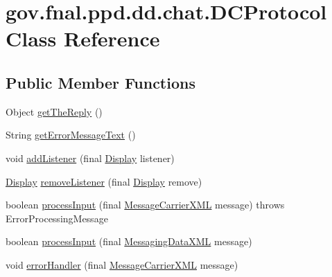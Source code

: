 \hypertarget{classgov_1_1fnal_1_1ppd_1_1dd_1_1chat_1_1DCProtocol}{\section{gov.\-fnal.\-ppd.\-dd.\-chat.\-D\-C\-Protocol Class Reference}
\label{classgov_1_1fnal_1_1ppd_1_1dd_1_1chat_1_1DCProtocol}
}
\subsection*{Public Member Functions}
\begin{DoxyCompactItemize}
\item 
Object \hyperlink{classgov_1_1fnal_1_1ppd_1_1dd_1_1chat_1_1DCProtocol_a17f34e0e46490a5296f36c383e057183}{get\-The\-Reply} ()
\item 
String \hyperlink{classgov_1_1fnal_1_1ppd_1_1dd_1_1chat_1_1DCProtocol_ac722cf203ee54e89313dba3fb6fb5a0d}{get\-Error\-Message\-Text} ()
\item 
void \hyperlink{classgov_1_1fnal_1_1ppd_1_1dd_1_1chat_1_1DCProtocol_a2557f193a252b6bd8c88216df32a0c1d}{add\-Listener} (final \hyperlink{interfacegov_1_1fnal_1_1ppd_1_1dd_1_1signage_1_1Display}{Display} listener)
\item 
\hyperlink{interfacegov_1_1fnal_1_1ppd_1_1dd_1_1signage_1_1Display}{Display} \hyperlink{classgov_1_1fnal_1_1ppd_1_1dd_1_1chat_1_1DCProtocol_a50cc43db9fbfb5d00eb14c5ef4917b2f}{remove\-Listener} (final \hyperlink{interfacegov_1_1fnal_1_1ppd_1_1dd_1_1signage_1_1Display}{Display} remove)
\item 
boolean \hyperlink{classgov_1_1fnal_1_1ppd_1_1dd_1_1chat_1_1DCProtocol_a432e76ab4d5b25e8bab88f3bc06d664c}{process\-Input} (final \hyperlink{classgov_1_1fnal_1_1ppd_1_1dd_1_1xml_1_1MessageCarrierXML}{Message\-Carrier\-X\-M\-L} message)  throws Error\-Processing\-Message 
\item 
boolean \hyperlink{classgov_1_1fnal_1_1ppd_1_1dd_1_1chat_1_1DCProtocol_acb588a2dee6973aa4deb06c78438fb35}{process\-Input} (final \hyperlink{classgov_1_1fnal_1_1ppd_1_1dd_1_1xml_1_1MessagingDataXML}{Messaging\-Data\-X\-M\-L} message)
\item 
void \hyperlink{classgov_1_1fnal_1_1ppd_1_1dd_1_1chat_1_1DCProtocol_a2416f6bc488ba5df57b6db649399ba99}{error\-Handler} (final \hyperlink{classgov_1_1fnal_1_1ppd_1_1dd_1_1xml_1_1MessageCarrierXML}{Message\-Carrier\-X\-M\-L} message)
\end{DoxyCompactItemize}
